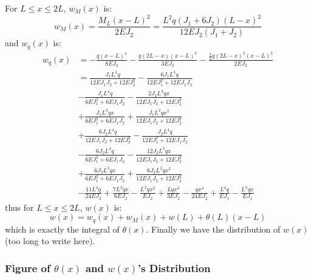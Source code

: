 For $L \leq x \leq 2L$, $w_M(x)$ is:
\begin{equation}
    w_M(x) =
    \frac{M_L (x-L)^2}{2EJ_2}=
    \frac{L^{2} q \left(J_{1} + 6 J_{2}\right) \left(L - x\right)^{2}}{12 E J_{2} \left(J_{1} + J_{2}\right)}
\end{equation}
and $w_q(x)$ is:
\begin{equation}
    \begin{aligned}
        w_q(x) &=
            -\frac{q(x-L)^4}{8EJ_2}-
            \frac{q(2L-x) (x-L)^3}{3EJ_2}-
            \frac{\frac{1}{2}q (2L-x)^2 (x-L)^2}{2EJ_2}\\
        &=
        \frac{J_{1} L^{4} q}{12 E J_{1} J_{2} + 12 E J_{2}^{2}} - \frac{6 J_{1} L^{4} q}{12 E J_{1}^{2} + 12 E J_{1} J_{2}} \\
        &- \frac{J_{1} L^{4} q}{6 E J_{1}^{2} + 6 E J_{1} J_{2}} - \frac{2 J_{1} L^{3} q x}{12 E J_{1} J_{2} + 12 E J_{2}^{2}} \\
        &+ \frac{J_{1} L^{3} q x}{6 E J_{1}^{2} + 6 E J_{1} J_{2}} + \frac{J_{1} L^{2} q x^{2}}{12 E J_{1} J_{2} + 12 E J_{2}^{2}} \\
        &+ \frac{6 J_{2} L^{4} q}{12 E J_{1} J_{2} + 12 E J_{2}^{2}} - \frac{J_{2} L^{4} q}{12 E J_{1}^{2} + 12 E J_{1} J_{2}} \\
        &- \frac{6 J_{2} L^{4} q}{6 E J_{1}^{2} + 6 E J_{1} J_{2}} - \frac{12 J_{2} L^{3} q x}{12 E J_{1} J_{2} + 12 E J_{2}^{2}} \\
        &+ \frac{6 J_{2} L^{3} q x}{6 E J_{1}^{2} + 6 E J_{1} J_{2}} + \frac{6 J_{2} L^{2} q x^{2}}{12 E J_{1} J_{2} + 12 E J_{2}^{2}} \\
        &- \frac{11 L^{4} q}{24 E J_{2}} + \frac{7 L^{3} q x}{6 E J_{2}} - \frac{L^{2} q x^{2}}{E J_{2}} + \frac{L q x^{3}}{3 E J_{2}} - \frac{q x^{4}}{24 E J_{2}} + \frac{L^{4} q}{E J_{1}} - \frac{L^{3} q x}{E J_{1}}
    \end{aligned}
\end{equation}
thus for $L \leq x \leq 2L$, $w(x)$ is:
\begin{equation}
    w(x)=
    w_q(x) + w_M(x) + w(L) + \theta(L)(x-L)
\end{equation}
which is exactly the integral of $\theta(x)$.
Finally we have the distribution of $w(x)$ (too long to write here).

\subsubsection{Figure of $\theta(x)$ and $w(x)$'s Distribution}

